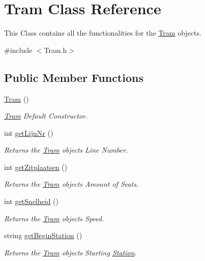 \hypertarget{classTram}{}\section{Tram Class Reference}
\label{classTram}


This Class contains all the functionalities for the \hyperlink{classTram}{Tram} objects.  




{\ttfamily \#include $<$Tram.\+h$>$}

\subsection*{Public Member Functions}
\begin{DoxyCompactItemize}
\item 
\hyperlink{classTram_aad83b2e7e79d57528691bf317ab0e1ef}{Tram} ()
\begin{DoxyCompactList}\small\item\em \hyperlink{classTram}{Tram} Default Constructor. \end{DoxyCompactList}\item 
int \hyperlink{classTram_ab5a70cf696779f9dff401244e203f6c8}{get\+Lijn\+Nr} ()
\begin{DoxyCompactList}\small\item\em Returns the \hyperlink{classTram}{Tram} object\textquotesingle{}s Line Number. \end{DoxyCompactList}\item 
int \hyperlink{classTram_a018207b3cd1f01821b5f64e4f4f394a5}{get\+Zitplaatsen} ()
\begin{DoxyCompactList}\small\item\em Returns the \hyperlink{classTram}{Tram} object\textquotesingle{}s Amount of Seats. \end{DoxyCompactList}\item 
int \hyperlink{classTram_afcd79d44b9bc18fb1e7302daa40f56f5}{get\+Snelheid} ()
\begin{DoxyCompactList}\small\item\em Returns the \hyperlink{classTram}{Tram} object\textquotesingle{}s Speed. \end{DoxyCompactList}\item 
string \hyperlink{classTram_a0d61611abd4dc61f3fbad6b4b7bc6403}{get\+Begin\+Station} ()
\begin{DoxyCompactList}\small\item\em Returns the \hyperlink{classTram}{Tram} object\textquotesingle{}s Starting \hyperlink{classStation}{Station}. \end{DoxyCompactList}\item 

\end{DoxyCompactItemize}
